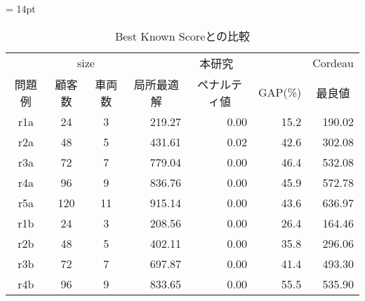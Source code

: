 \begin{table}[]
\tabcolsep = 14pt
\renewcommand{\arraystretch}{0.8}
\caption{Best Known Scoreとの比較}
\label{cordeau}
\begin{tabular}{cccrrrr}
\hline
\multicolumn{1}{l}{} & \multicolumn{2}{c}{size}                    & \multicolumn{3}{c}{本研究}                                                            & \multicolumn{1}{c}{Cordeau} \\ \cline{2-7}
問題例                  & 顧客数                  & 車両数                  & \multicolumn{1}{c}{局所最適解} & \multicolumn{1}{c}{ペナルティ値} & \multicolumn{1}{c}{GAP(\%)} & \multicolumn{1}{c}{最良値}     \\ \cline{2-7}
r1a                  & 24                   & 3                    & 219.27                  & 0.00                       & 15.2                        & 190.02                      \\
r2a                  & 48                   & 5                    & 431.61                  & 0.02                       & 42.6                        & 302.08                      \\
r3a                  & 72                   & 7                    & 779.04                  & 0.00                       & 46.4                        & 532.08                      \\
r4a                  & 96                   & 9                    & 836.76                  & 0.00                       & 45.9                        & 572.78                      \\
r5a                  & 120                  & 11                   & 915.14                  & 0.00                       & 43.6                        & 636.97                      \\
r1b                  & 24                   & 3                    & 208.56                  & 0.00                       & 26.4                        & 164.46                      \\
r2b                  & 48                   & 5                    & 402.11                  & 0.00                       & 35.8                        & 296.06                      \\
r3b                  & 72                   & 7                    & 697.87                  & 0.00                       & 41.4                        & 493.30                      \\
r4b                  & 96                   & 9                    & 833.65                  & 0.00                       & 55.5                        & 535.90                      \\

\end{tabular}
\end{table}
